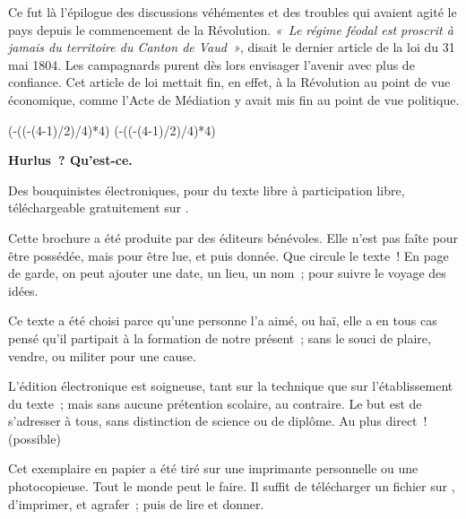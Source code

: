 \documentclass[french,twoside]{book} %
\newcommand\chapterclose{} %
\def\truncdiv#1#2{((#1-(#2-1)/2)/#2)}
\def\moduloop#1#2{(#1-\truncdiv{#1}{#2}*#2)}
\def\modulo#1#2{\number\numexpr\moduloop{#1}{#2}\relax}
\begin{document}
Ce fut là l’épilogue des discussions véhémentes et des troubles qui avaient agité le pays depuis le commencement de la Révolution. \emph{« Le régime féodal est proscrit à jamais du territoire du Canton de Vaud »}, disait le dernier article de la loi du 31 mai 1804. Les campagnards purent dès lors envisager l’avenir avec plus de confiance. Cet article de loi mettait fin, en effet, à la Révolution au point de vue économique, comme l’Acte de Médiation y avait mis fin au point de vue politique.
\chapterclose

 


\ifbooklet
  \pagestyle{empty}
  \clearpage
  \ifnum\modulo{\value{page}}{4}=0 \hbox{}\newpage\hbox{}\newpage\fi
  \ifnum\modulo{\value{page}}{4}=1 \hbox{}\newpage\hbox{}\newpage\fi


  \hbox{}\newpage
  \ifodd\value{page}\hbox{}\newpage\fi
  {\centering\color{rubric}\bfseries\noindent\large
    Hurlus ? Qu’est-ce.\par
    \bigskip
  }
  \noindent Des bouquinistes électroniques, pour du texte libre à participation libre,
  téléchargeable gratuitement sur \href{https://hurlus.fr}{}.\par
  \bigskip
  \noindent Cette brochure a été produite par des éditeurs bénévoles.
  Elle n’est pas faîte pour être possédée, mais pour être lue, et puis donnée.
  Que circule le texte !
  En page de garde, on peut ajouter une date, un lieu, un nom ; pour suivre le voyage des idées.
  \par

  Ce texte a été choisi parce qu’une personne l’a aimé,
  ou haï, elle a en tous cas pensé qu’il partipait à la formation de notre présent ;
  sans le souci de plaire, vendre, ou militer pour une cause.
  \par

  L’édition électronique est soigneuse, tant sur la technique
  que sur l’établissement du texte ; mais sans aucune prétention scolaire, au contraire.
  Le but est de s’adresser à tous, sans distinction de science ou de diplôme.
  Au plus direct ! (possible)
  \par

  Cet exemplaire en papier a été tiré sur une imprimante personnelle
   ou une photocopieuse. Tout le monde peut le faire.
  Il suffit de
  télécharger un fichier sur \href{https://hurlus.fr}{},
  d’imprimer, et agrafer ; puis de lire et donner.\par
\end{document}
